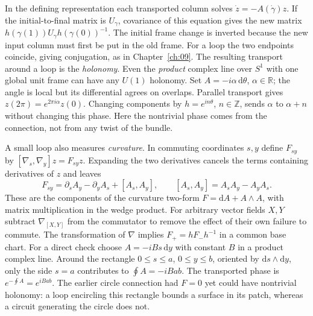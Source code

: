 In the defining representation each transported column solves $\dot z=-A(\dot\gamma)z$. If the initial-to-final matrix is $U_\gamma$, covariance of this equation gives the new matrix $h(\gamma(1))U_\gamma h(\gamma(0))^{-1}$. The initial frame change is inverted because the new input column must first be put in the old frame. For a loop the two endpoints coincide, giving conjugation, as in Chapter~\ref{ch:09}. The resulting transport around a loop is the \emph{holonomy}. Even the \emph{product} complex line over $S^1$ with one global unit frame can have any $U(1)$ holonomy. Set $A=-i\alpha\,\mathrm{d}\theta$, $\alpha\in\mathbb R$; the angle is local but its differential agrees on overlaps. Parallel transport gives $z(2\pi)=e^{2\pi i\alpha}z(0)$. Changing components by $h=e^{i n\theta}$, $n\in\mathbb Z$, sends $\alpha$ to $\alpha+n$ without changing this phase. Here the nontrivial phase comes from the connection, not from any twist of the bundle.

A small loop also measures \emph{curvature}. In commuting coordinates $s,y$ define $F_{sy}$ by $[\nabla_s,\nabla_y]z=F_{sy}z$. Expanding the two derivatives cancels the terms containing derivatives of $z$ and leaves
\[
 F_{sy}=\partial_s A_y-\partial_y A_s+[A_s,A_y],\qquad [A_s,A_y]=A_sA_y-A_yA_s .
\]
These are the components of the curvature two-form $F=\mathrm{d}A+A\wedge A$, with matrix multiplication in the wedge product. For arbitrary vector fields $X,Y$ subtract $\nabla_{[X,Y]}$ from the commutator to remove the effect of their own failure to commute. The transformation of $\nabla$ implies $F_+=h F_-h^{-1}$ in a common base chart. For a direct check choose $A=-i B s\,\mathrm{d}y$ with constant $B$ in a product complex line. Around the rectangle $0\leq s\leq a$, $0\leq y\leq b$, oriented by $\mathrm{d}s\wedge\mathrm{d}y$, only the side $s=a$ contributes to $\oint A=-iBab$. The transported phase is $e^{-\oint A}=e^{iBab}$. The earlier circle connection had $F=0$ yet could have nontrivial holonomy: a loop encircling this rectangle bounds a surface in its patch, whereas a circuit generating the circle does not.

